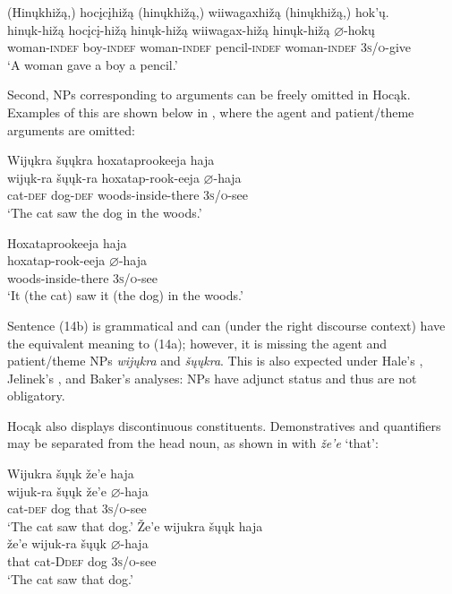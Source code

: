 \documentclass[output=paper]{LSP/langsci}
\begin{document}
\ea
\glll (Hin\k{u}khi\v{z}ą,) 	hoc\k{i}c\k{i}hi\v{z}ą 	(hin\k{u}khi\v{z}ą,) wiiwagaxhi\v{z}ą 	(hin\k{u}khi\v{z}ą,) hok'\k{u}.\\
hin\k{u}k-hi\v{z}ą 		hoc\k{i}c\k{i}-hi\v{z}ą 	hin\k{u}k-hi\v{z}ą 		wiiwagax-hi\v{z}ą 	hin\k{u}k-hi\v{z}ą 	$\varnothing$-hok\k{u}\\
	woman-\textsc{indef}	boy-\textsc{indef} 	woman-\textsc{indef} 	pencil-\textsc{indef} 	woman-\textsc{indef} 	\textsc{3s/o}-give\\
\trans `A woman gave a boy a pencil.'
\z
	
Second, NPs corresponding to arguments can be freely omitted in Hocąk. Examples of this are shown below in , where the agent and patient/theme arguments are omitted:

\begin{exe}
\ex
\begin{xlist}
\ex 
\glll Wij\k{u}kra	\v{s}\k{u}\k{u}kra		hoxataprookeeja 		haja\\
wij\k{u}k-ra	\v{s}\k{u}\k{u}k-ra	hoxatap-rook-eeja 	$\varnothing$-haja \\
	cat-\textsc{def} 	dog-\textsc{def} 	woods-inside-there 	\textsc{3s/o}-see \\
\trans `The cat saw the dog in the woods.'

\ex 
\glll Hoxataprookeeja haja \\
hoxatap-rook-eeja 	$\varnothing$-haja \\
woods-inside-there \textsc{3s/o}-see \\
\trans `It (the cat) saw it (the dog) in the woods.'
\end{xlist}
\end{exe}

Sentence (14b) is grammatical and can (under the right discourse context) have the equivalent meaning to (14a); however, it is missing the agent and patient/theme NPs \textit{wij\k{u}kra} and \textit{\v{s}\k{u}\k{u}kra}. This is also expected under Hale's , Jelinek's , and Baker's  analyses: NPs have adjunct status and thus are not obligatory.

Hocąk also displays discontinuous constituents. Demonstratives and quantifiers may be separated from the head noun, as shown in  with \textit{\v{z}e'e} `that': 

\begin{exe}
\ex
\begin{xlist}
\ex  
\glll Wijukra	\v{s}\k{u}\k{u}k	\v{z}e'e	haja \\
wijuk-ra	\v{s}\k{u}\k{u}k	\v{z}e'e	$\varnothing$-haja \\
	cat-\textsc{def} 	dog	that		\textsc{3s/o}-see\\
\trans `The cat saw that dog.'
\ex 
\glll \v{Z}e'e	wijukra	 \v{s}\k{u}\k{u}k	haja \\
\v{z}e'e	wijuk-ra	\v{s}\k{u}\k{u}k	$\varnothing$-haja \\
that cat-D\textsc{def} dog \textsc{3s/o}-see \\
\trans `The cat saw that dog.'
\end{xlist}
\end{exe}
\end{document}
